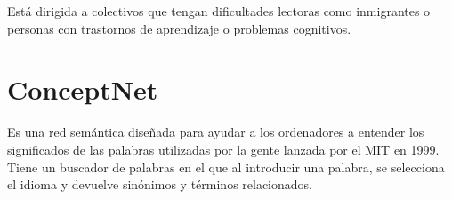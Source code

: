 Está dirigida a colectivos que tengan dificultades lectoras como inmigrantes o personas con trastornos de aprendizaje o problemas cognitivos.

\section{ConceptNet} 

Es una red semántica diseñada para ayudar a los ordenadores a entender los significados de las palabras utilizadas por la gente lanzada por el MIT en 1999.
Tiene un buscador de palabras en el que al introducir una palabra, se selecciona el idioma y devuelve sinónimos y términos relacionados.

